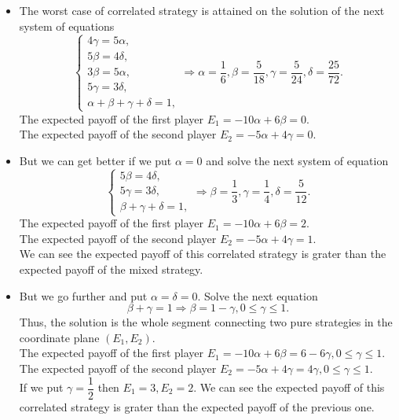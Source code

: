 \documentclass[a4paper, 12pt]{article}
\begin{document}
\begin{itemize}
	\item The worst case of correlated strategy is attained on the solution of the next system of equations
$$
\begin{cases}
4 \gamma = 5 \alpha, \\
5 \beta = 4 \delta, \\
3 \beta = 5 \alpha, \\
5 \gamma = 3 \delta, \\
\alpha + \beta + \gamma + \delta = 1,
\end{cases}
\Rightarrow
\alpha = \dfrac{1}{6}, \beta = \dfrac{5}{18}, \gamma = \dfrac{5}{24}, \delta = \dfrac{25}{72}.
$$
The expected payoff of the first player $E_1 = -10 \alpha + 6 \beta = 0.$\\
The expected payoff of the second player $E_2 = -5 \alpha + 4 \gamma = 0.$
	\item But we can get better if we put $\alpha = 0$ and solve the next system of equation
$$
\begin{cases}
5 \beta = 4 \delta, \\
5 \gamma = 3 \delta, \\
\beta + \gamma + \delta = 1,
\end{cases}
\Rightarrow
\beta = \dfrac{1}{3}, \gamma = \dfrac{1}{4}, \delta = \dfrac{5}{12}.
$$
The expected payoff of the first player $E_1 = -10 \alpha + 6 \beta = 2.$\\
The expected payoff of the second player $E_2 = -5 \alpha + 4 \gamma = 1.$\\
We can see the expected payoff of this correlated strategy is grater than the expected payoff of the mixed strategy.
	\item But we go further and put $\alpha = \delta = 0.$ Solve the next equation
$$
\beta + \gamma = 1
\Rightarrow
\beta = 1 - \gamma, 0 \leqslant \gamma \leqslant 1.
$$
Thus, the solution is the whole segment connecting two pure strategies in the coordinate plane $(E_1, E_2).$\\
The expected payoff of the first player $E_1 = -10 \alpha + 6 \beta = 6 - 6 \gamma, 0 \leqslant \gamma \leqslant 1.$\\
The expected payoff of the second player $E_2 = -5 \alpha + 4 \gamma = 4 \gamma, 0 \leqslant \gamma \leqslant 1.$\\
If we put $\gamma = \dfrac{1}{2}$ then $E_1 = 3, E_2 = 2.$ We can see the expected payoff of this correlated strategy is grater than the expected payoff of the previous one.
\end{itemize}
\end{document}
